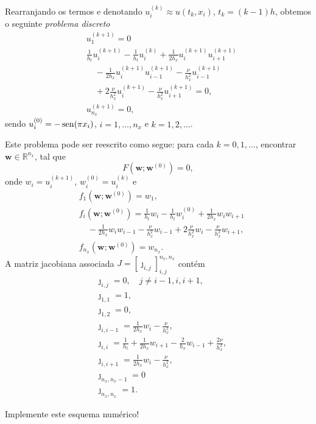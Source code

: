\begin{ex}
  Rearranjando os termos e denotando $u^{(k)}_i\approx u(t_k, x_i)$, $t_k = (k-1)h$, obtemos o seguinte \emph{problema discreto}
  \begin{align}
    & u^{(k+1)}_1 = 0\\
    & \frac{1}{h_t}u^{(k+1)}_i - \frac{1}{h_t}u^{(k)}_i + \frac{1}{2h_x}u^{(k+1)}_iu^{(k+1)}_{i+1} \nonumber\\
    &\quad - \frac{1}{2h_x}u^{(k+1)}_{i}u^{(k+1)}_{i-1} - \frac{\nu}{h_x^2}u^{(k+1)}_{i-1} \nonumber\\ 
    &\quad + 2\frac{\nu}{h_x^2}u^{(k+1)}_i - \frac{\nu}{h_x^2}u^{(k+1)}_{i+1} = 0,\\
    & u^{(k+1)}_{n_x} = 0,
  \end{align}
  sendo $u^{(0)}_i = -\operatorname{sen}(\pi x_i)$, $i = 1, \dotsc, n_x$ e $k = 1, 2, \ldots$.

  Este problema pode ser reescrito como segue: para cada $k = 0, 1, \ldots$, encontrar $\pmb{w}\in\mathbb{R}^{n_x}$, tal que
  \begin{equation}
    F\left(\pmb{w}; \pmb{w}^{(0)}\right) = 0, 
  \end{equation}
  onde $w_{i} = u^{(k+1)}_i$, $w_{i}^{(0)} = u^{(k)}_{i}$ e
  \begin{align}
    & f_1\left(\pmb{w}; \pmb{w}^{(0)}\right) = w_1,\\
    & f_{i}\left(\pmb{w}; \pmb{w}^{(0)}\right) = \frac{1}{h_t}w_i - \frac{1}{h_t}w^{(0)}_i + \frac{1}{2h_x}w_iw_{i+1} \nonumber\\
    &\quad - \frac{1}{2h_x}w_iw_{i-1} - \frac{\nu}{h_x^2}w_{i-1} + 2\frac{\nu}{h_x^2}w_i - \frac{\nu}{h_x^2}w_{i+1},\\
    &f_{n_x}\left(\pmb{w}; \pmb{w}^{(0)}\right) = w_{n_x}.
  \end{align}
  A matriz jacobiana associada $J=[\jmath_{i,j}]_{i,j}^{n_x,n_x}$ contém
  \begin{align}
    & \jmath_{i,j} = 0,\quad j\neq i-1,i,i+1,\\
    & \jmath_{1,1} = 1,\\
    & \jmath_{1,2} = 0,\\
    & \jmath_{i,i-1} = \frac{1}{2h_x}w_i - \frac{\nu}{h_x^2},\\
    & \jmath_{i,i} = \frac{1}{h_t} + \frac{1}{2h_x}w_{i+1} - \frac{2}{h_x}w_{i-1} + \frac{2\nu}{h_x^2},\\
    & \jmath_{i,i+1} = \frac{1}{2h_x}w_{i} - \frac{\nu}{h_x^2},\\
    & \jmath_{n_x,n_x-1} = 0\\
    & \jmath_{n_x,n_x} = 1.
  \end{align}

  Implemente este esquema numérico!
\end{ex}

